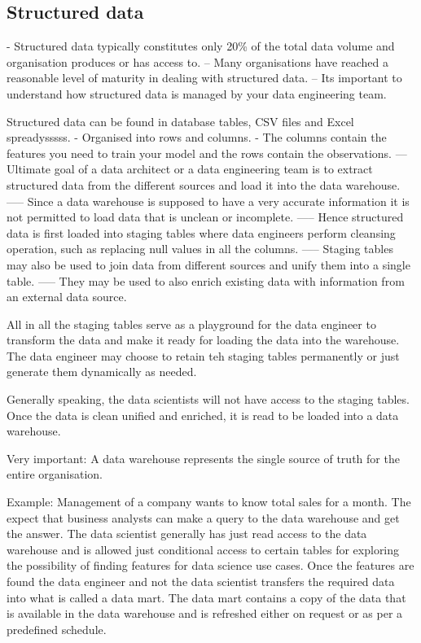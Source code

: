 \documentclass[a4paper, 11pt]{article}
\begin{document}
    \subsection{Structured data}
    - Structured data typically constitutes only 20\% of the total data volume and organisation produces or has access to.
    -- Many organisations have reached a reasonable level of maturity in dealing with structured data.
    -- Its important to understand how structured data is managed by your data engineering team.

    Structured data can be found in database tables, CSV files and Excel spreadysssss.
    - Organised into rows and columns.
    - The columns contain the features you need to train your model and the rows contain the observations.
    --- Ultimate goal of a data architect or a data engineering team is to extract structured data from the different sources and load it into the data warehouse.
    ----- Since a data warehouse is supposed to have a very accurate information it is not permitted to load data that is unclean or incomplete.
    ----- Hence structured data is first loaded into staging tables where data engineers perform cleansing operation, such as replacing null values in all the columns.
    ----- Staging tables may also be used to join data from different sources and unify them into a single table.
    ----- They may be used to also enrich existing data with information from an external data source.

    All in all the staging tables serve as a playground for the data engineer to transform the data and make it ready for loading the data into the warehouse.
    The data engineer may choose to retain teh staging tables permanently or just generate them dynamically as needed.

    Generally speaking, the data scientists will not have access to the staging tables.
    Once the data is clean unified and enriched, it is read to be loaded into a data warehouse.

    Very important: A data warehouse represents the single source of truth for the entire organisation.

    Example:
    Management of a company wants to know total sales for a month. The expect that business analysts can make a query to the data warehouse and get the answer.
    The data scientist generally has just read access to the data warehouse and is allowed just conditional access to certain tables for exploring the possibility of finding features for data science use cases.
    Once the features are found the data engineer and not the data scientist transfers the required data into what is called a data mart.
    The data mart contains a copy of the data that is available in the data warehouse and is refreshed either on request or as per a predefined schedule.
\end{document}

